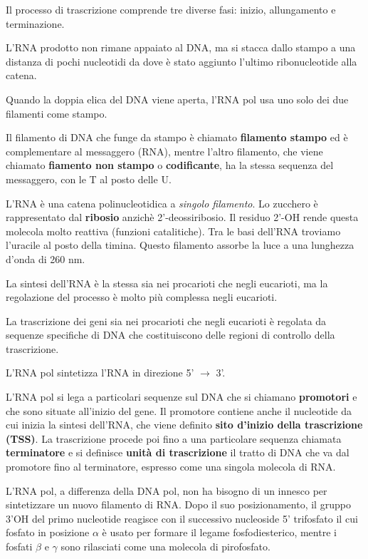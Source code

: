 \documentclass[11pt]{book}
\begin{document}
Il processo di trascrizione comprende tre diverse fasi: inizio,
allungamento e terminazione.

L'RNA prodotto non rimane appaiato al DNA, ma si stacca dallo stampo a
una distanza di pochi nucleotidi da dove è stato aggiunto l'ultimo
ribonucleotide alla catena.

Quando la doppia elica del DNA viene aperta, l'RNA pol usa uno solo dei
due filamenti come stampo.

Il filamento di DNA che funge da stampo è chiamato \textbf{filamento
stampo} ed è complementare al messaggero (RNA), mentre l'altro
filamento, che viene chiamato \textbf{fiamento non stampo} o
\textbf{codificante}, ha la stessa sequenza del messaggero, con le T al
posto delle U.

L'RNA è una catena polinucleotidica a \emph{singolo filamento}. Lo
zucchero è rappresentato dal \textbf{ribosio} anzichè 2'-deossiribosio.
Il residuo 2'-OH rende questa molecola molto reattiva (funzioni
catalitiche). Tra le basi dell'RNA troviamo l'uracile al posto della
timina. Questo filamento assorbe la luce a una lunghezza d'onda di 260
nm.

La sintesi dell'RNA è la stessa sia nei procarioti che negli eucarioti,
ma la regolazione del processo è molto più complessa negli eucarioti.

La trascrizione dei geni sia nei procarioti che negli eucarioti è
regolata da sequenze specifiche di DNA che costituiscono delle regioni
di controllo della trascrizione.

L'RNA pol sintetizza l'RNA in direzione 5' \(\rightarrow\) 3'.

L'RNA pol si lega a particolari sequenze sul DNA che si chiamano
\textbf{promotori} e che sono situate all'inizio del gene. Il promotore
contiene anche il nucleotide da cui inizia la sintesi dell'RNA, che
viene definito \textbf{sito d'inizio della trascrizione (TSS)}. La
trascrizione procede poi fino a una particolare sequenza chiamata
\textbf{terminatore} e si definisce \textbf{unità di trascrizione} il
tratto di DNA che va dal promotore fino al terminatore, espresso come
una singola molecola di RNA.

L'RNA pol, a differenza della DNA pol, non ha bisogno di un innesco per
sintetizzare un nuovo filamento di RNA. Dopo il suo posizionamento, il
gruppo 3'OH del primo nucleotide reagisce con il successivo nucleoside
5' trifosfato il cui fosfato in posizione \(\alpha\) è usato per formare
il legame fosfodiesterico, mentre i fosfati \(\beta\) e \(\gamma\) sono
rilasciati come una molecola di pirofosfato.
\end{document}
